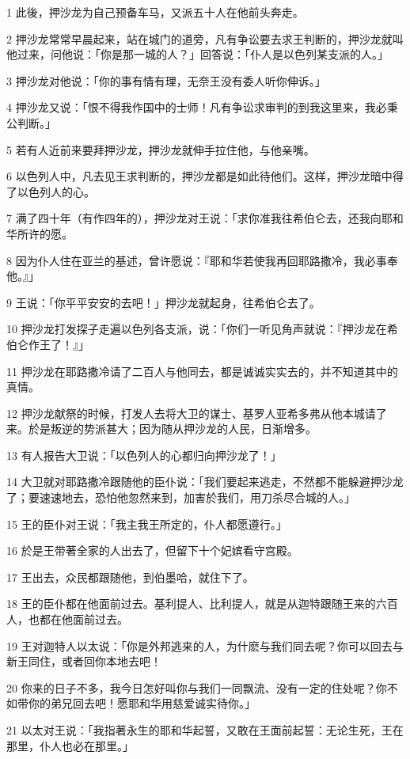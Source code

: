 \par 1 此後，押沙龙为自己预备车马，又派五十人在他前头奔走。
\par 2 押沙龙常常早晨起来，站在城门的道旁，凡有争讼要去求王判断的，押沙龙就叫他过来，问他说：「你是那一城的人？」回答说：「仆人是以色列某支派的人。」
\par 3 押沙龙对他说：「你的事有情有理，无奈王没有委人听你伸诉。」
\par 4 押沙龙又说：「恨不得我作国中的士师！凡有争讼求审判的到我这里来，我必秉公判断。」
\par 5 若有人近前来要拜押沙龙，押沙龙就伸手拉住他，与他亲嘴。
\par 6 以色列人中，凡去见王求判断的，押沙龙都是如此待他们。这样，押沙龙暗中得了以色列人的心。
\par 7 满了四十年（有作四年的），押沙龙对王说：「求你准我往希伯仑去，还我向耶和华所许的愿。
\par 8 因为仆人住在亚兰的基述，曾许愿说：『耶和华若使我再回耶路撒冷，我必事奉他。』」
\par 9 王说：「你平平安安的去吧！」押沙龙就起身，往希伯仑去了。
\par 10 押沙龙打发探子走遍以色列各支派，说：「你们一听见角声就说：『押沙龙在希伯仑作王了！』」
\par 11 押沙龙在耶路撒冷请了二百人与他同去，都是诚诚实实去的，并不知道其中的真情。
\par 12 押沙龙献祭的时候，打发人去将大卫的谋士、基罗人亚希多弗从他本城请了来。於是叛逆的势派甚大；因为随从押沙龙的人民，日渐增多。
\par 13 有人报告大卫说：「以色列人的心都归向押沙龙了！」
\par 14 大卫就对耶路撒冷跟随他的臣仆说：「我们要起来逃走，不然都不能躲避押沙龙了；要速速地去，恐怕他忽然来到，加害於我们，用刀杀尽合城的人。」
\par 15 王的臣仆对王说：「我主我王所定的，仆人都愿遵行。」
\par 16 於是王带著全家的人出去了，但留下十个妃嫔看守宫殿。
\par 17 王出去，众民都跟随他，到伯墨哈，就住下了。
\par 18 王的臣仆都在他面前过去。基利提人、比利提人，就是从迦特跟随王来的六百人，也都在他面前过去。
\par 19 王对迦特人以太说：「你是外邦逃来的人，为什麽与我们同去呢？你可以回去与新王同住，或者回你本地去吧！
\par 20 你来的日子不多，我今日怎好叫你与我们一同飘流、没有一定的住处呢？你不如带你的弟兄回去吧！愿耶和华用慈爱诚实待你。」
\par 21 以太对王说：「我指著永生的耶和华起誓，又敢在王面前起誓：无论生死，王在那里，仆人也必在那里。」
